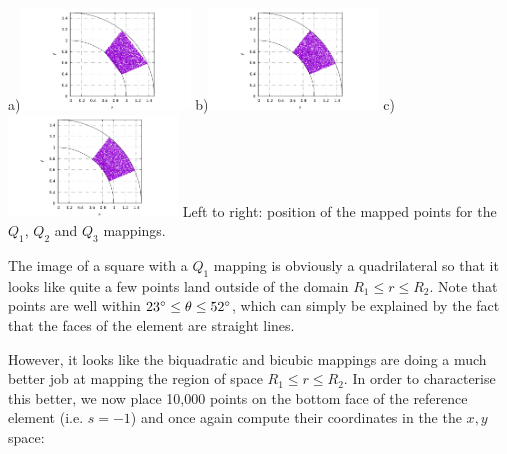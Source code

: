 \begin{center}
a)\includegraphics[width=4.5cm]{images/mappings/curved/xy1_keep.pdf}
b)\includegraphics[width=4.5cm]{images/mappings/curved/xy2_keep.pdf}
c)\includegraphics[width=4.5cm]{images/mappings/curved/xy3_keep.pdf}
{\small Left to right: position of the mapped points for the $Q_1$, $Q_2$ and $Q_3$ mappings.}
\end{center}

The image of a square with a $Q_1$ mapping is obviously a quadrilateral
so that it looks like quite a few points land outside of the domain $R_1\leq r\leq R_2$.
Note that points are well within $23\degree \leq \theta \leq 52\degree$, which can 
simply be explained by the fact that the faces of the element are straight lines.

However, it looks like the biquadratic and bicubic mappings are doing a much better 
job at mapping the region of space $R_1\leq r\leq R_2$. In order to characterise 
this better, we now place 10,000 points on the bottom face of the reference element (i.e. $s=-1$)
and once again compute their coordinates in the the $x,y$ space:


